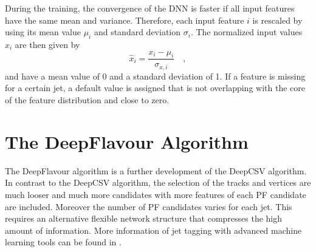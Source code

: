 
During the training, the convergence of the DNN is faster if all input features have the same mean and variance. Therefore, each input feature $i$ is rescaled by using its mean value $\mu_i$ and standard deviation $\sigma_{i}$. The normalized input values $\hat{x}_i$ are then given by
\begin{equation}
\hat{x}_i = \frac{x_i - \mu_i}{\sigma_{x,i}} \quad ,
\end{equation}
and have a mean value of 0 and a standard deviation of 1. If a feature is missing for a certain jet, a default value is assigned that is not overlapping with the core of the feature distribution and close to zero. 


\section{The DeepFlavour Algorithm}\label{sec:ch_deepFlavour}
The DeepFlavour algorithm \cite{DeepFlavour} is a further development of the DeepCSV algorithm. In contrast to the DeepCSV algorithm, the selection of the tracks and vertices are much looser and much more candidates with more features of each PF candidate are included. Moreover the number of PF candidates varies for each jet. This requires an alternative flexible network structure that compresses the high amount of information. More information of jet tagging with advanced machine learning tools can be found in \cite{JetClassificationDNN}. 

